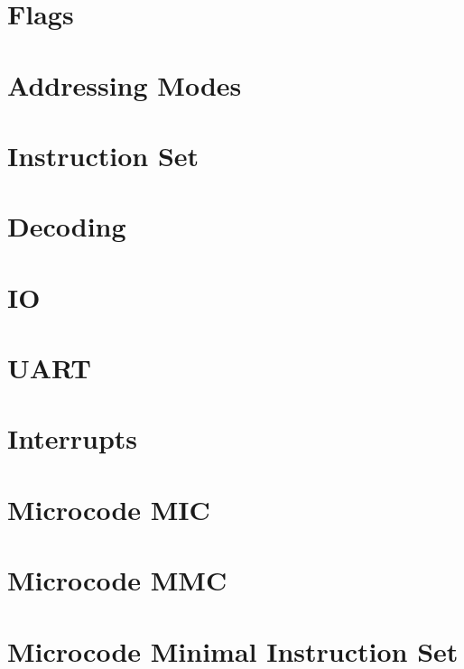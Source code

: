 \documentclass[a4paper,12pt]{article}
\begin{document}
\section{Flags}


\section{Addressing Modes}


\section{Instruction Set}


\section{Decoding}


\section{IO}


\section{UART}


\section{Interrupts}


\section{Microcode MIC}


\section{Microcode MMC}


\section{Microcode Minimal Instruction Set}

\end{document}
